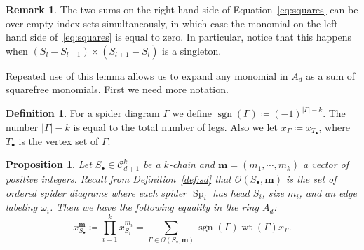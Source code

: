 \documentclass[10pt,a4paper]{amsart}
\newtheorem{prop}[thm]{Proposition}
\theoremstyle{definition}
\newtheorem{defi}[thm]{Definition}
\newtheorem{rema}[thm]{Remark}
\newcommand{\bm}[1]{{\boldsymbol{#1}}}
\newcommand\m{\bm{m}}
\DeclareMathOperator{\wt}{wt}
\DeclareMathOperator{\Sp}{Sp}
\DeclareMathOperator{\sgn}{sgn}
\newcommand{\D}{{\Gamma}}
\newcommand{\lspd}{\mathcal O}
\newcommand{\CC}{\mathcal{C}}
\begin{document}
\begin{rema}\label{rem:zerocase}
	The two sums on the right hand side of Equation~\eqref{eq:squares} can be over empty index sets simultaneously, in which case the monomial on the left hand side of~\eqref{eq:squares} is equal to zero. In particular, notice that this happens when $(S_{l}-S_{l-1})\times (S_{l+1}-S_{l})$ is a singleton.
\end{rema}




Repeated use of this lemma allows us to expand any monomial in $A_d$ as a sum of squarefree monomials.  First we need more notation. %

\begin{defi}
	For a spider diagram $\D$ we define $\sgn(\D)\coloneqq (-1)^{|\D|-k}$. The number $|\D|-k$ is equal to the total number of legs. Also we let $x_\D\coloneqq x_{T_\bullet}$, where $T_\bullet$ is the vertex set of $\D$.
\end{defi}


\begin{prop}\label{prop:expanding}
	Let $S_\bullet\in\CC_{d+1}^k$ be a $k$-chain and $\m = (m_1,\cdots,m_k)$ a vector of positive integers. 
	Recall from Definition~\ref{def:sd} that $\lspd(S_\bullet,\m)$ is the set of ordered spider diagrams where each spider $\Sp_i$ has head $S_i$, size $m_i$, and an edge labeling $\omega_i$.
	Then we have the following equality in the ring $A_d$:
	\begin{equation}\label{eq:expansion}
	x_{S_\bullet}^\m\coloneqq \prod_{i=1}^k x_{S_i}^{m_i} = \sum_{\D\in\lspd(S_\bullet,\m)}\sgn(\D)\wt(\D)x_\D.
	\end{equation}
\end{prop}
\end{document}
